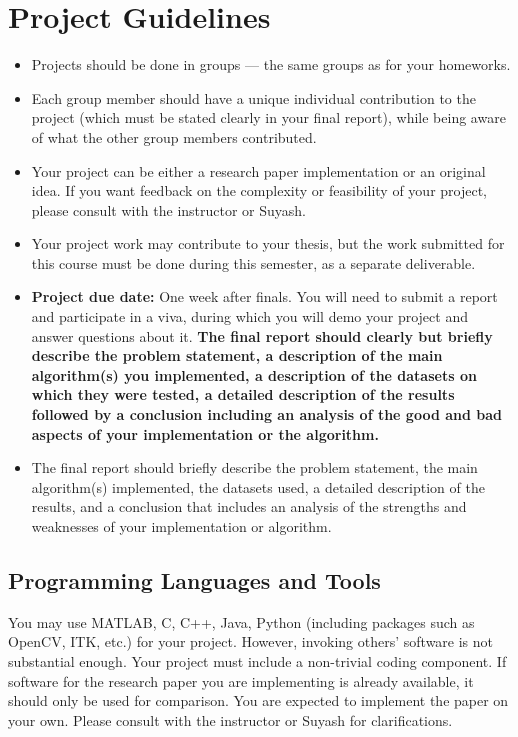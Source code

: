 \documentclass[11pt]{article}
\begin{document}
\maketitle

\section*{Project Guidelines}
\begin{itemize}
    \item Projects should be done in groups — the same groups as for your homeworks.
    \item Each group member should have a unique individual contribution to the project (which must be stated clearly in your final report), while being aware of what the other group members contributed.
    \item Your project can be either a research paper implementation or an original idea. If you want feedback on the complexity or feasibility of your project, please consult with the instructor or Suyash.
    \item Your project work may contribute to your thesis, but the work submitted for this course must be done during this semester, as a separate deliverable.
    \item \textbf{Project due date:} One week after finals. You will need to submit a report and participate in a viva, during which you will demo your project and answer questions about it. \textbf{The final report should clearly but briefly describe the problem statement, a description of the main algorithm(s) you implemented, a description of the datasets on which they were tested, a detailed description of the results followed by a conclusion including an analysis of the good and bad aspects of your implementation or the algorithm.}
    \item The final report should briefly describe the problem statement, the main algorithm(s) implemented, the datasets used, a detailed description of the results, and a conclusion that includes an analysis of the strengths and weaknesses of your implementation or algorithm.
\end{itemize}

\subsection*{Programming Languages and Tools}

You may use MATLAB, C, C++, Java, Python (including packages such as OpenCV, ITK, etc.) for your project. However, invoking others' software is not substantial enough. Your project must include a non-trivial coding component. If software for the research paper you are implementing is already available, it should only be used for comparison. You are expected to implement the paper on your own. Please consult with the instructor or Suyash for clarifications.
\end{document}
